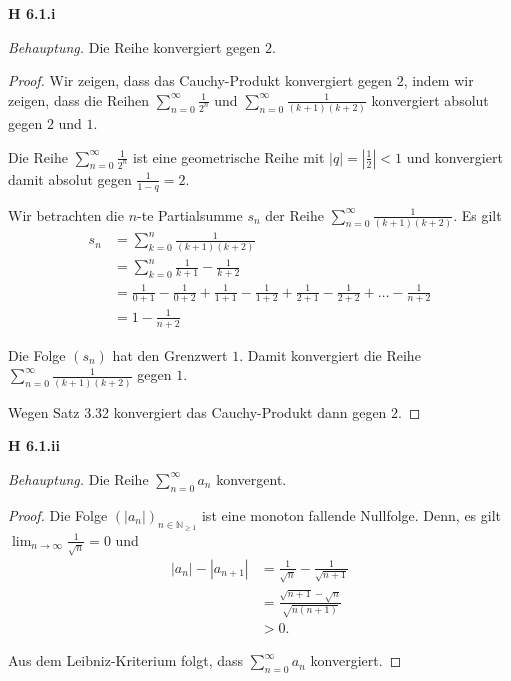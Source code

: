 \documentclass[12pt]{extarticle}
\begin{document}
\textbf{H 6.1.i}

\textit{Behauptung.}  Die Reihe konvergiert gegen \(2\).
\begin{proof}
  Wir zeigen, dass das Cauchy-Produkt konvergiert gegen \(2\), indem wir
  zeigen, dass die Reihen \(\sum_{n=0}^{\infty}{\frac{1}{2^n}}\) und
  \(\sum_{n=0}^{\infty}{\frac{1}{(k+1)(k+2)}}\) konvergiert absolut
  gegen \(2\) und \(1\).

  Die Reihe \(\sum_{n=0}^{\infty}{\frac{1}{2^n}}\)  ist eine
  geometrische Reihe mit $\left|  q \right|  = \left|  \frac{1}{2}
  \right|  < 1$ und konvergiert damit absolut gegen \(\frac{1}{1-q}=2\).

  Wir betrachten die \(n\)-te Partialsumme \(s_n\) der Reihe
  \(\sum_{n=0}^{\infty}{\frac{1}{(k+1)(k+2)}}\).  Es gilt
\begin{align*}
  s_n &= \sum_{k=0}^n{\frac{1}{(k+1)(k+2)}}\\
      &= \sum_{k=0}^n{\frac{1}{k+1}-\frac{1}{k+2}}\\
      &=
        \frac{1}{0+1}-\frac{1}{0+2}
        +\frac{1}{1+1}-\frac{1}{1+2}
        +\frac{1}{2+1}-\frac{1}{2+2}+\ldots-\frac{1}{n+2}\\
      &= 1 - \frac{1}{n+2}
\end{align*}

Die Folge \((s_n)\) hat den Grenzwert \(1\).  Damit konvergiert die Reihe
\(\sum_{n=0}^{\infty}{\frac{1}{(k+1)(k+2)}}\) gegen \(1\).

Wegen Satz 3.32 konvergiert das Cauchy-Produkt dann gegen \(2\).
\end{proof}

\textbf{H 6.1.ii}

\textit{Behauptung.}  Die Reihe \(\sum_{n=0}^{\infty}{a_n}\) konvergent.

\begin{proof}
  Die Folge \((\left|  a_n \right| )_{n \in \mathbb{N}_{\geq 1}}\) ist eine monoton
  fallende Nullfolge.  Denn, es gilt $\lim_{n \rightarrow
    \infty}{\frac{1}{\sqrt{n}}}=0$ und
\begin{align*}
  \left|  a_n \right|  - \left|  a_{n+1} \right|
  &= \frac{1}{\sqrt{n}} - \frac{1}{\sqrt{n+1}}\\
  &= \frac{\sqrt{n+1}-\sqrt{n}}{\sqrt{n(n+1)}} \\
  &> 0.
\end{align*}

Aus dem Leibniz-Kriterium folgt, dass \(\sum_{n=0}^{\infty}{a_n}\) konvergiert.
\end{proof}
\end{document}
